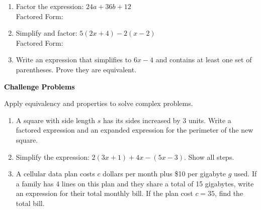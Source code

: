 \documentclass[12pt, letterpaper, fleqn]{article}
\newcommand{\blanklong}{\underline{\hspace{6.5cm}}}
\begin{document}
\begin{enumerate}[itemsep=2.2cm, leftmargin=0.6cm]

\item Factor the expression: $24a + 36b + 12$ \\
Factored Form: \blanklong

\vspace{2cm}

\item Simplify and factor: $5(2x + 4) - 2(x - 2)$ \\
Factored Form: \blanklong

\vspace{2cm}

\item Write an expression that simplifies to $6x - 4$ and contains at least one set of parentheses. Prove they are equivalent.

\vspace{2cm}

\end{enumerate}

\newpage

\begin{tcolorbox}[colback=black!10]
\large\textcolor{black}{\textbf{Challenge Problems}}
\end{tcolorbox}

\noindent
Apply equivalency and properties to solve complex problems.

\vspace{3mm}

\begin{enumerate}[itemsep=2.4cm, leftmargin=0.6cm]

\item A square with side length $s$ has its sides increased by 3 units. Write a factored expression and an expanded expression for the perimeter of the new square.

\vspace{2.3cm}

\item Simplify the expression: $2(3x + 1) + 4x - (5x - 3)$. Show all steps.

\vspace{2.3cm}

\item A cellular data plan costs $c$ dollars per month plus \$10 per gigabyte $g$ used. If a family has 4 lines on this plan and they share a total of 15 gigabytes, write an expression for their total monthly bill. If the plan cost $c = 35$, find the total bill.

\vspace{2.5cm}

\end{enumerate}
\end{document}
